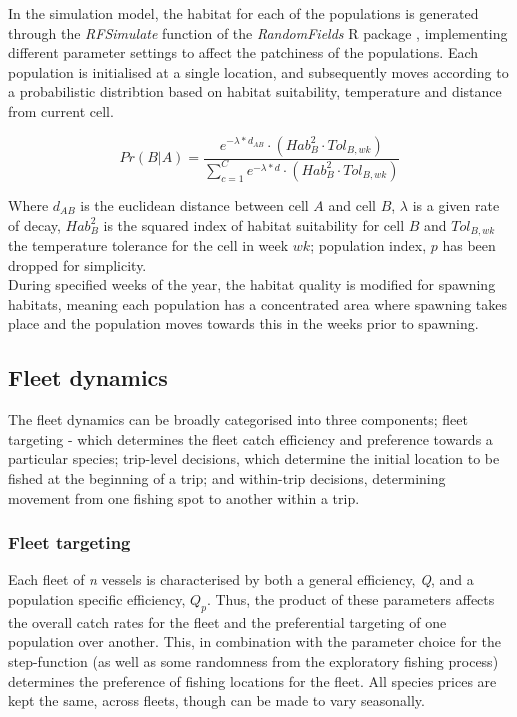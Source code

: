 \documentclass[review]{elsarticle}
\begin{document}
In the simulation model, the habitat for each of the populations is generated
through the \textit{RFSimulate} function of the \textit{RandomFields} R package
\citep{Schlater2015}, implementing different parameter settings to affect the
patchiness of the populations. Each population is initialised at a single
location, and subsequently moves according to a probabilistic distribtion based
on habitat suitability, temperature and distance from current cell. 

\begin{equation}
	Pr(B | A) = \frac{e^{-\lambda * d_{AB}} \cdot
		(Hab_{B}^2 \cdot Tol_{B,wk})}{\sum\limits_{c=1}^{C}e^{-\lambda * d} \cdot
		(Hab_{B}^2 \cdot Tol_{B,wk})}
\end{equation}

Where $d_{AB}$ is the euclidean distance between cell $A$ and cell $B$,
$\lambda$ is a given rate of decay, $Hab_{B}^2$ is the squared index of habitat
suitability for cell $B$ and $Tol_{B,wk}$ the temperature tolerance for the
cell in week $wk$; population index, $p$ has been dropped for simplicity.\\

During specified weeks of the year, the habitat quality is modified for
spawning habitats, meaning each population has a concentrated area where
spawning takes place and the population moves towards this in the weeks prior
to spawning. \\

\subsection{Fleet dynamics}

The fleet dynamics can be broadly categorised into three components; fleet
targeting - which determines the fleet catch efficiency and preference towards
a particular species; trip-level decisions, which determine the initial
location to be fished at the beginning of a trip; and within-trip decisions,
determining movement from one fishing spot to another within a trip.

\subsubsection{Fleet targeting}

Each fleet of \textit{n} vessels is characterised by both a general efficiency,
\textit{Q}, and a population specific efficiency, ${Q_{p}}$.  Thus, the product
of these parameters affects the overall catch rates for the fleet and the
preferential targeting of one population over another. This, in combination
with the parameter choice for the step-function (as well as some randomness
from the exploratory fishing process) determines the preference of fishing
locations for the fleet.  All species prices are kept the same, across fleets,
though can be made to vary seasonally.  
\end{document}
